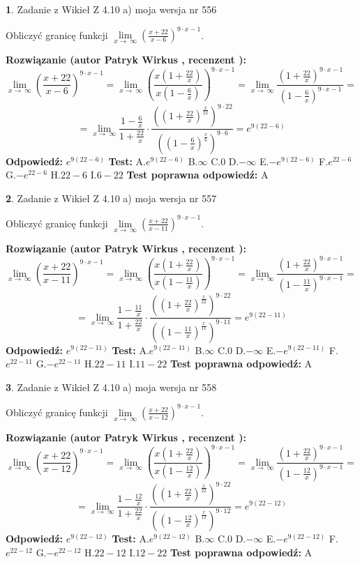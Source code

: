 \documentclass[12pt, a4paper]{article}
\theoremstyle{definition} %
\newtheorem{zad}{}
\newcommand{\zadStart}[1]{\begin{zad}#1\newline}
\newcommand{\zadStop}{\end{zad}}
\newcommand{\rozwStart}[2]{\noindent \textbf{Rozwiązanie (autor #1 , recenzent #2): }\newline}
\newcommand{\rozwStop}{\newline}
\newcommand{\odpStart}{\noindent \textbf{Odpowiedź:}\newline}
\newcommand{\odpStop}{\newline}
\newcommand{\testStart}{\noindent \textbf{Test:}\newline}
\newcommand{\testStop}{\newline}
\newcommand{\kluczStart}{\noindent \textbf{Test poprawna odpowiedź:}\newline}
\newcommand{\kluczStop}{\newline}
\begin{document}
\zadStart{Zadanie z Wikieł Z 4.10 a) moja wersja nr 556}


Obliczyć granicę funkcji  $\lim\limits_{x\to\ \infty}(\frac{x+22}{x-6})^{9\cdot x-1}$.
\zadStop
\rozwStart{Patryk Wirkus}{}
$$\lim\limits_{x\to\ \infty}(\frac{x+22}{x-6})^{9\cdot x-1} = \lim\limits_{x\to\ \infty}(\frac{x(1+\frac{22}{x})}{x(1-\frac{6}{x})})^{9\cdot x-1}=\lim\limits_{x\to\ \infty}\frac{(1+\frac{22}{x})^{9\cdot x-1}}{(1-\frac{6}{x})^{9\cdot x-1}}=$$
$$=\lim\limits_{x\to\ \infty}\frac{1-\frac{6}{x}}{1+\frac{22}{x}}\cdot\frac{((1+\frac{22}{x})^{\frac{x}{22}})^{9\cdot22}}{((1-\frac{6}{x})^{\frac{x}{6}})^{9\cdot6}}=e^{9(22-6)}$$
\rozwStop
\odpStart
$e^{9(22-6)}$
\odpStop
\testStart
A.$e^{9(22-6)}$ B.$\infty$ C.$0$ D.$-\infty$ E.$-e^{9(22-6)}$
F.$e^{22-6}$ G.$-e^{22-6}$
H.$22-6$
I.$6-22$
\testStop
\kluczStart
A
\kluczStop



\zadStart{Zadanie z Wikieł Z 4.10 a) moja wersja nr 557}


Obliczyć granicę funkcji  $\lim\limits_{x\to\ \infty}(\frac{x+22}{x-11})^{9\cdot x-1}$.
\zadStop
\rozwStart{Patryk Wirkus}{}
$$\lim\limits_{x\to\ \infty}(\frac{x+22}{x-11})^{9\cdot x-1} = \lim\limits_{x\to\ \infty}(\frac{x(1+\frac{22}{x})}{x(1-\frac{11}{x})})^{9\cdot x-1}=\lim\limits_{x\to\ \infty}\frac{(1+\frac{22}{x})^{9\cdot x-1}}{(1-\frac{11}{x})^{9\cdot x-1}}=$$
$$=\lim\limits_{x\to\ \infty}\frac{1-\frac{11}{x}}{1+\frac{22}{x}}\cdot\frac{((1+\frac{22}{x})^{\frac{x}{22}})^{9\cdot22}}{((1-\frac{11}{x})^{\frac{x}{11}})^{9\cdot11}}=e^{9(22-11)}$$
\rozwStop
\odpStart
$e^{9(22-11)}$
\odpStop
\testStart
A.$e^{9(22-11)}$ B.$\infty$ C.$0$ D.$-\infty$ E.$-e^{9(22-11)}$
F.$e^{22-11}$ G.$-e^{22-11}$
H.$22-11$
I.$11-22$
\testStop
\kluczStart
A
\kluczStop



\zadStart{Zadanie z Wikieł Z 4.10 a) moja wersja nr 558}


Obliczyć granicę funkcji  $\lim\limits_{x\to\ \infty}(\frac{x+22}{x-12})^{9\cdot x-1}$.
\zadStop
\rozwStart{Patryk Wirkus}{}
$$\lim\limits_{x\to\ \infty}(\frac{x+22}{x-12})^{9\cdot x-1} = \lim\limits_{x\to\ \infty}(\frac{x(1+\frac{22}{x})}{x(1-\frac{12}{x})})^{9\cdot x-1}=\lim\limits_{x\to\ \infty}\frac{(1+\frac{22}{x})^{9\cdot x-1}}{(1-\frac{12}{x})^{9\cdot x-1}}=$$
$$=\lim\limits_{x\to\ \infty}\frac{1-\frac{12}{x}}{1+\frac{22}{x}}\cdot\frac{((1+\frac{22}{x})^{\frac{x}{22}})^{9\cdot22}}{((1-\frac{12}{x})^{\frac{x}{12}})^{9\cdot12}}=e^{9(22-12)}$$
\rozwStop
\odpStart
$e^{9(22-12)}$
\odpStop
\testStart
A.$e^{9(22-12)}$ B.$\infty$ C.$0$ D.$-\infty$ E.$-e^{9(22-12)}$
F.$e^{22-12}$ G.$-e^{22-12}$
H.$22-12$
I.$12-22$
\testStop
\kluczStart
A
\kluczStop
\end{document}
